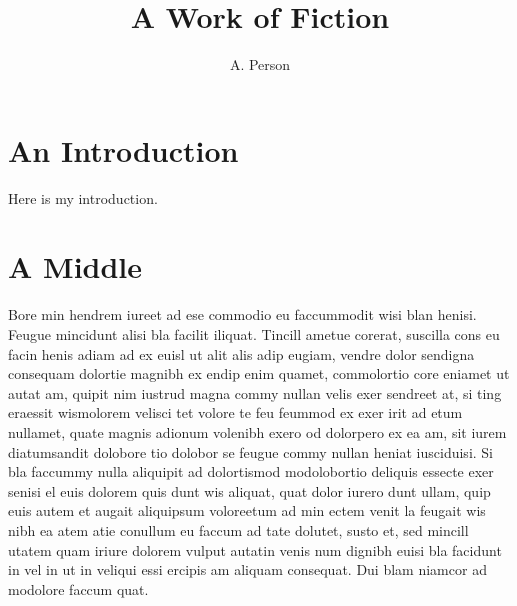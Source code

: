 \documentclass[twocolumn]{article}
\author{A. Person}
\title{A Work of Fiction}
\begin{document}
\maketitle

\tableofcontents

\section{An Introduction}
Here is my introduction.

\section{A Middle}
Bore min hendrem iureet ad ese commodio eu faccummodit wisi blan henisi.
Feugue mincidunt alisi bla facilit iliquat.
Tincill ametue corerat, suscilla cons eu facin henis adiam ad ex euisl ut alit alis adip eugiam, vendre dolor sendigna consequam dolortie magnibh ex endip enim quamet, commolortio core eniamet ut autat am, quipit nim iustrud magna commy nullan velis exer sendreet at, si ting eraessit wismolorem velisci tet volore te feu feummod ex exer irit ad etum nullamet, quate magnis adionum volenibh exero od dolorpero ex ea am, sit iurem diatumsandit dolobore tio dolobor se feugue commy nullan heniat iusciduisi.
Si bla faccummy nulla aliquipit ad dolortismod modolobortio deliquis essecte exer senisi el euis dolorem quis dunt wis aliquat, quat dolor iurero dunt ullam, quip euis autem et augait aliquipsum voloreetum ad min ectem venit la feugait wis nibh ea atem atie conullum eu faccum ad tate dolutet, susto et, sed mincill utatem quam iriure dolorem vulput autatin venis num dignibh euisi bla facidunt in vel in ut in veliqui essi ercipis am aliquam consequat. Dui blam niamcor ad modolore faccum quat.
\end{document}
